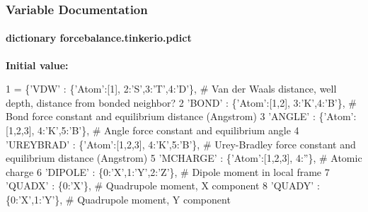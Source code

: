 \subsubsection{Variable Documentation}
\hypertarget{namespaceforcebalance_1_1tinkerio_a714d1b926359d7d11559720e422ec34d}{
\paragraph[{pdict}]{\setlength{\rightskip}{0pt plus 5cm}dictionary forcebalance.\-tinkerio.\-pdict}}\label{namespaceforcebalance_1_1tinkerio_a714d1b926359d7d11559720e422ec34d}
{\bfseries Initial value\-:}
\begin{DoxyCode}
1 = \{\textcolor{stringliteral}{'VDW'}          : \{\textcolor{stringliteral}{'Atom'}:[1], 2:\textcolor{stringliteral}{'S'},3:\textcolor{stringliteral}{'T'},4:\textcolor{stringliteral}{'D'}\}, \textcolor{comment}{# Van der Waals distance, well depth, distance from
       bonded neighbor?}
2          \textcolor{stringliteral}{'BOND'}         : \{\textcolor{stringliteral}{'Atom'}:[1,2], 3:\textcolor{stringliteral}{'K'},4:\textcolor{stringliteral}{'B'}\},     \textcolor{comment}{# Bond force constant and equilibrium distance
       (Angstrom)}
3          \textcolor{stringliteral}{'ANGLE'}        : \{\textcolor{stringliteral}{'Atom'}:[1,2,3], 4:\textcolor{stringliteral}{'K'},5:\textcolor{stringliteral}{'B'}\},   \textcolor{comment}{# Angle force constant and equilibrium angle}
4          \textcolor{stringliteral}{'UREYBRAD'}     : \{\textcolor{stringliteral}{'Atom'}:[1,2,3], 4:\textcolor{stringliteral}{'K'},5:\textcolor{stringliteral}{'B'}\},   \textcolor{comment}{# Urey-Bradley force constant and equilibrium
       distance (Angstrom)}
5          \textcolor{stringliteral}{'MCHARGE'}       : \{\textcolor{stringliteral}{'Atom'}:[1,2,3], 4:\textcolor{stringliteral}{''}\},          \textcolor{comment}{# Atomic charge}
6          \textcolor{stringliteral}{'DIPOLE'}       : \{0:\textcolor{stringliteral}{'X'},1:\textcolor{stringliteral}{'Y'},2:\textcolor{stringliteral}{'Z'}\},             \textcolor{comment}{# Dipole moment in local frame}
7          \textcolor{stringliteral}{'QUADX'}        : \{0:\textcolor{stringliteral}{'X'}\},                         \textcolor{comment}{# Quadrupole moment, X component}
8          \textcolor{stringliteral}{'QUADY'}        : \{0:\textcolor{stringliteral}{'X'},1:\textcolor{stringliteral}{'Y'}\},                   \textcolor{comment}{# Quadrupole moment, Y component}

\end{DoxyCode}
